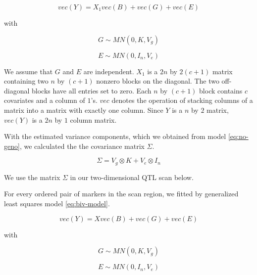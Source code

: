 \documentclass[oneside]{book}
\begin{document}
\begin{equation}
vec(Y) = X_1 vec(B) + vec(G) + vec(E)
\label{eq:no-geno}
\end{equation}

with 

\begin{equation}
G \sim MN(0, K, V_g)
\end{equation}

\begin{equation}
E \sim MN(0, I_n, V_e)
\end{equation}

We assume that $G$ and $E$ are independent. $X_1$ is a $2n$ by $2(c + 1)$ matrix containing two $n$ by $(c + 1)$ nonzero blocks on the diagonal. The two off-diagonal blocks have all entries set to zero. Each $n$ by $(c + 1)$ block contains $c$ covariates and a column of $1$'s. $vec$ denotes the operation of stacking columns of a matrix into a matrix with exactly one column. Since $Y$ is a $n$ by $2$ matrix, $vec(Y)$ is a $2n$ by $1$ column matrix.


With the estimated variance components, which we obtained from model \ref{eq:no-geno}, we calculated the the covariance matrix $\Sigma$.

\begin{equation}
\Sigma = V_g \otimes K + V_e \otimes I_n
\end{equation}

We use the matrix $\Sigma$ in our two-dimensional QTL scan below.




For every ordered pair of markers in the scan region, we fitted by generalized least squares model \ref{eq:biv-model}.

\begin{equation}
vec(Y) = X vec(B) + vec(G) + vec(E)
\label{eq:biv-model}
\end{equation}

with 

\begin{equation}
G \sim MN(0, K, V_g)
\end{equation}

\begin{equation}
E \sim MN(0, I_n, V_e)
\end{equation}
\end{document}
